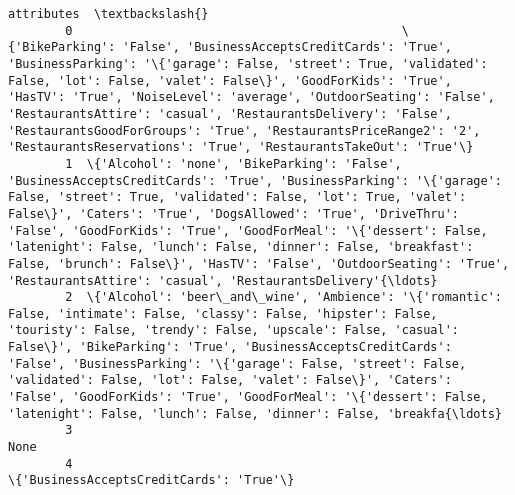 \documentclass[11pt]{article}
\begin{document}
\begin{Verbatim}[commandchars=\\\{\}]
                                                                                                                                                                                                                                                                                                                                                                                                                                                                                                                    attributes  \textbackslash{}
        0                                              \{'BikeParking': 'False', 'BusinessAcceptsCreditCards': 'True', 'BusinessParking': '\{'garage': False, 'street': True, 'validated': False, 'lot': False, 'valet': False\}', 'GoodForKids': 'True', 'HasTV': 'True', 'NoiseLevel': 'average', 'OutdoorSeating': 'False', 'RestaurantsAttire': 'casual', 'RestaurantsDelivery': 'False', 'RestaurantsGoodForGroups': 'True', 'RestaurantsPriceRange2': '2', 'RestaurantsReservations': 'True', 'RestaurantsTakeOut': 'True'\}   
        1  \{'Alcohol': 'none', 'BikeParking': 'False', 'BusinessAcceptsCreditCards': 'True', 'BusinessParking': '\{'garage': False, 'street': True, 'validated': False, 'lot': True, 'valet': False\}', 'Caters': 'True', 'DogsAllowed': 'True', 'DriveThru': 'False', 'GoodForKids': 'True', 'GoodForMeal': '\{'dessert': False, 'latenight': False, 'lunch': False, 'dinner': False, 'breakfast': False, 'brunch': False\}', 'HasTV': 'False', 'OutdoorSeating': 'True', 'RestaurantsAttire': 'casual', 'RestaurantsDelivery'{\ldots}   
        2  \{'Alcohol': 'beer\_and\_wine', 'Ambience': '\{'romantic': False, 'intimate': False, 'classy': False, 'hipster': False, 'touristy': False, 'trendy': False, 'upscale': False, 'casual': False\}', 'BikeParking': 'True', 'BusinessAcceptsCreditCards': 'False', 'BusinessParking': '\{'garage': False, 'street': False, 'validated': False, 'lot': False, 'valet': False\}', 'Caters': 'False', 'GoodForKids': 'True', 'GoodForMeal': '\{'dessert': False, 'latenight': False, 'lunch': False, 'dinner': False, 'breakfa{\ldots}   
        3                                                                                                                                                                                                                                                                                                                                                                                                                                                                                                                 None   
        4                                                                                                                                                                                                                                                                                                                                                                                                                                                                               \{'BusinessAcceptsCreditCards': 'True'\}   
        

\end{Verbatim}
\end{document}
